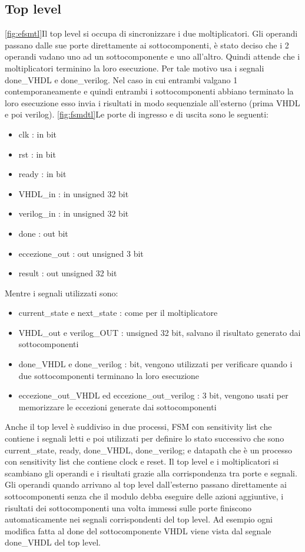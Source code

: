 \documentclass[]{IEEEtran}
\begin{document}
\subsection{Top level}
\ref{fig:efsmtl}Il top level si occupa di sincronizzare i due moltiplicatori. Gli operandi passano dalle sue porte direttamente ai sottocomponenti, è stato deciso che i 2 operandi vadano uno ad un sottocomponente e uno all'altro. Quindi attende che i moltiplicatori terminino la loro esecuzione. Per tale motivo usa i segnali done\_VHDL e done\_verilog. Nel caso in cui entrambi valgano 1 contemporaneamente e quindi entrambi i sottocomponenti abbiano terminato la loro esecuzione esso invia i risultati in modo sequenziale all’esterno (prima VHDL e poi verilog). 
\ref{fig:fsmdtl}Le porte di ingresso e di uscita sono le seguenti:
\begin{itemize}
\item clk : in bit
\item rst : in bit
\item ready : in bit
\item VHDL\_in : in unsigned 32 bit
\item verilog\_in : in unsigned 32 bit
\item done : out bit
\item eccezione\_out : out unsigned 3 bit
\item result : out unsigned 32 bit
\end{itemize}
Mentre i segnali utilizzati sono:
\begin{itemize}
	\item current\_state e next\_state : come per il moltiplicatore
	\item VHDL\_out e verilog\_OUT : unsigned 32 bit, salvano il risultato generato dai sottocomponenti
	\item done\_VHDL e done\_verilog : bit, vengono utilizzati per verificare quando i due sottocomponenti terminano la loro 	esecuzione
	\item eccezione\_out\_VHDL ed eccezione\_out\_verilog : 3 bit, vengono usati per memorizzare le eccezioni generate dai sottocomponenti
\end{itemize}
Anche il top level è suddiviso in due processi, FSM con sensitivity list che contiene i segnali letti e poi utilizzati per definire lo stato successivo che sono current\_state, ready, done\_VHDL, done\_verilog; e datapath che è un processo con sensitivity list che contiene clock e reset.
Il top level e i moltiplicatori si scambiano gli operandi e i risultati grazie alla corrispondenza tra porte e segnali. Gli operandi quando arrivano al top level dall’esterno passano direttamente ai sottocomponenti senza che il modulo debba eseguire delle azioni aggiuntive, i risultati dei sottocomponenti una volta immessi sulle porte finiscono automaticamente nei segnali corrispondenti del top level. Ad esempio ogni modifica fatta al done del sottocomponente VHDL viene vista dal segnale done\_VHDL del top level.
\end{document}
